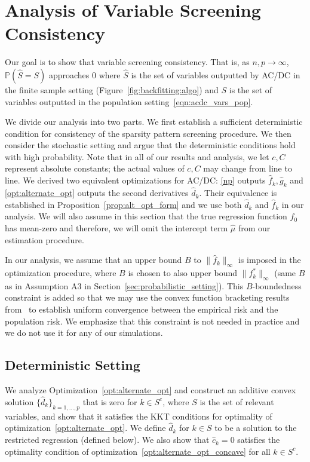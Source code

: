 \section{Analysis of Variable Screening Consistency}
\label{sec:finitesample}

Our goal is to show that variable screening consistency. That is, as $n,p \rightarrow \infty$, $\mathbb{P}( \hat{S} = S)$ approaches 0 where $\hat{S}$ is the set of variables outputted by AC/DC in the finite sample setting (Figure~\ref{fig:backfitting:algo}) and $S$ is the set of variables outputted in the population setting~\eqref{eqn:acdc_vars_pop}.

We divide our analysis into two parts. We first establish a sufficient
deterministic condition for consistency of the sparsity pattern
screening procedure.  We then consider the stochastic setting and argue that the 
deterministic conditions hold with high probability. Note that in all of our results 
and analysis, we let $c,
C$ represent absolute constants; the actual values of $c,C$ may change from line to line. We derived two equivalent optimizations for AC/DC: \eqref{np} outputs $\hat{f}_k, \hat{g}_k$ and \eqref{opt:alternate_opt} outputs the second derivatives $\hat{d}_k$. Their equivalence is established in Proposition~\ref{prop:alt_opt_form} and we use both $\hat{d}_k$ and $\hat{f}_k$ in our analysis. We will also assume in this section that the true regression function $f_0$ has mean-zero and therefore, we will omit the intercept term $\hat{\mu}$ from our estimation procedure.

In our analysis, we assume that an upper bound $B$ to $\| \hat{f}_k \|_\infty$ 
is imposed in the optimization procedure, where $B$ is chosen to also upper bound $\| f^*_k \|_\infty$ (same $B$ as in Assumption A3 in Section~\ref{sec:probabilistic_setting}). This $B$-boundedness constraint is added so that we may use the convex function bracketing results from~\cite{kim2014global} to establish uniform convergence between the empirical risk and the population risk. We emphasize that this constraint is not needed in practice and we do not use it for any of our simulations. 


\subsection{Deterministic Setting}

We analyze Optimization~\ref{opt:alternate_opt} and construct an additive convex solution $\{\hat{d}_k\}_{k=1,\ldots,p}$
that is zero for $k \in S^c$, where $S$ is the set of relevant
variables, and show that it satisfies the KKT
conditions for optimality of optimization~\eqref{opt:alternate_opt}. We
define $\hat{d}_k$ for $k \in S$ to be a solution to the restricted
regression (defined below). We also show that $\hat{c}_k =
0$ satisfies the optimality condition of
optimization~\eqref{opt:alternate_opt_concave} for all $k \in S^c$.

